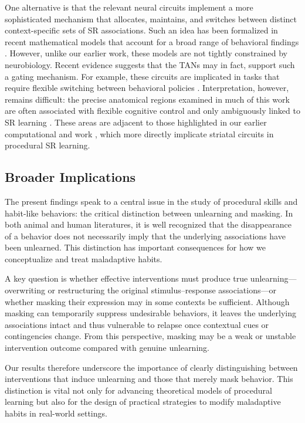 \documentclass{article}
\begin{document}
One alternative is that the relevant neural circuits
implement a more sophisticated mechanism that allocates,
maintains, and switches between distinct context-specific
sets of SR associations. Such an idea has been formalized in
recent mathematical models that account for a broad range of
behavioral findings \cite{gershman_context_2010}.
However, unlike our earlier work, these models are not
tightly constrained by neurobiology. Recent evidence
suggests that the TANs may in fact, support such a gating
mechanism. For example, these circuits are implicated in
tasks that require flexible switching between behavioral
policies \cite{bradfield_thalamostriatal_2018}.
Interpretation, however, remains difficult: the precise
anatomical regions examined in much of this work are often
associated with flexible cognitive control and only
ambiguously linked to SR learning \cite{yin_role_2006}.
These areas are adjacent to those highlighted in our earlier
computational and work \cite{ashby_computational_2011,
crossley_erasing_2013, crossley_context-dependent_2014,
crossley_expanding_2016}, which more directly implicate
striatal circuits in procedural SR learning.

\subsection{Broader Implications}
The present findings speak to a central issue in the study
of procedural skills and habit-like behaviors: the critical
distinction between unlearning and masking. In both animal
and human literatures, it is well recognized that the
disappearance of a behavior does not necessarily imply that
the underlying associations have been unlearned. This
distinction has important consequences for how we
conceptualize and treat maladaptive habits.

A key question is whether effective interventions must
produce true unlearning—overwriting or restructuring the
original stimulus--response associations—or whether masking
their expression may in some contexts be sufficient.
Although masking can temporarily suppress undesirable
behaviors, it leaves the underlying associations intact and
thus vulnerable to relapse once contextual cues or
contingencies change. From this perspective, masking may be
a weak or unstable intervention outcome compared with
genuine unlearning.

Our results therefore underscore the importance of clearly
distinguishing between interventions that induce unlearning
and those that merely mask behavior. This distinction is
vital not only for advancing theoretical models of
procedural learning but also for the design of practical
strategies to modify maladaptive habits in real-world
settings.
\end{document}
